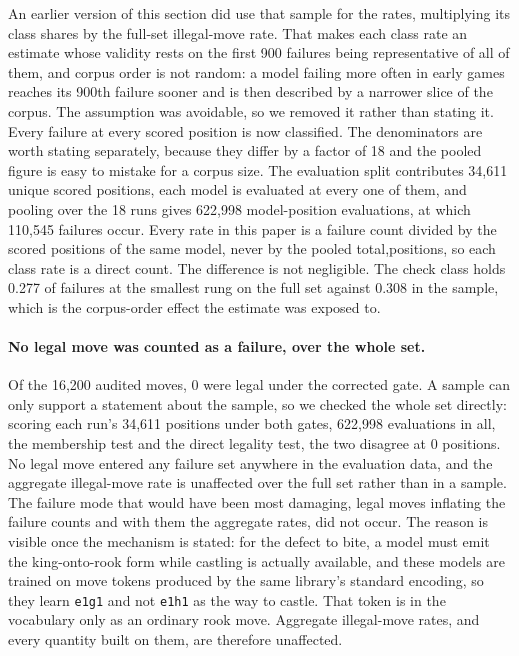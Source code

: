 \documentclass[11pt]{article}
\begin{document}
An earlier version of this section did use that sample for the rates, multiplying its
class shares by the full-set illegal-move rate. That makes each class rate an estimate
whose validity rests on the first 900 failures being representative of all of them,
and corpus order is not random: a model failing more often in early games reaches its
900th failure sooner and is then described by a narrower slice of the corpus. The
assumption was avoidable, so we removed it rather than stating it. Every failure at
every scored position is now classified. The denominators are worth stating
separately, because they differ by a factor of 18 and the pooled figure is easy
to mistake for a corpus size. The evaluation split contributes 34,611 unique
scored positions, each model is evaluated at every one of them, and pooling over the
18 runs gives 622,998 model-position evaluations, at which 110,545
failures occur. Every rate in this paper is a failure count divided by the scored
positions of the same model, never by the pooled total,positions, so each class rate is a direct count. The difference is not negligible.
The check class holds 0.277 of failures at the smallest rung on the full set
against 0.308 in the sample, which is the corpus-order effect the estimate was
exposed to.

\paragraph{No legal move was counted as a failure, over the whole set.}
Of the 16,200 audited moves, 0 were legal under the corrected gate. A sample
can only support a statement about the sample, so we checked the whole set directly:
scoring each run's 34,611 positions under both gates, 622,998 evaluations in
all, the
membership test and the direct legality test, the two disagree at 0 positions.
No legal move entered any failure set anywhere in the evaluation data, and the
aggregate illegal-move rate is unaffected over the full set rather than in a sample. The failure mode that would have been most damaging, legal moves
inflating the failure counts and with them the aggregate rates, did not occur. The
reason is visible once the mechanism is stated: for the defect to bite, a model must
emit the king-onto-rook form while castling is actually available, and these models
are trained on move tokens produced by the same library's standard encoding, so they
learn \texttt{e1g1} and not \texttt{e1h1} as the way to castle. That token is in the
vocabulary only as an ordinary rook move. Aggregate illegal-move rates, and every
quantity built on them, are therefore unaffected.
\end{document}
